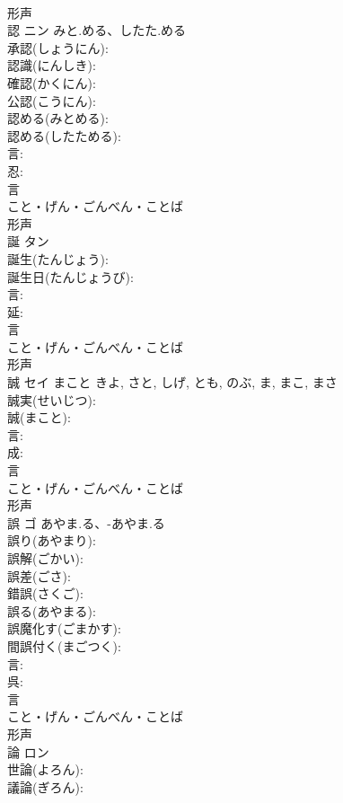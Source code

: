 \documentclass[8pt]{extreport}
\begin{document}
\begin{CJK}{UTF8}{min}
\\	形声 
\\	認	ニン	みと.める、したた.める		
\\	承認(しょうにん): 
\\	認識(にんしき): 
\\	確認(かくにん): 
\\	公認(こうにん): 
\\	認める(みとめる): 
\\	認める(したためる): 
\\	言: 
\\	忍: 
\\	言	
\\	こと・げん・ごんべん・ことば	
\\	形声 
\\	誕	タン			
\\	誕生(たんじょう): 
\\	誕生日(たんじょうび): 
\\	言: 
\\	延: 
\\	言	
\\	こと・げん・ごんべん・ことば	
\\	形声 
\\	誠	セイ	まこと	きよ, さと, しげ, とも, のぶ, ま, まこ, まさ	
\\	誠実(せいじつ): 
\\	誠(まこと): 
\\	言: 
\\	成: 
\\	言	
\\	こと・げん・ごんべん・ことば	
\\	形声 
\\	誤	ゴ	あやま.る、-あやま.る		
\\	誤り(あやまり): 
\\	誤解(ごかい): 
\\	誤差(ごさ): 
\\	錯誤(さくご): 
\\	誤る(あやまる): 
\\	誤魔化す(ごまかす): 
\\	間誤付く(まごつく): 
\\	言: 
\\	呉: 
\\	言	
\\	こと・げん・ごんべん・ことば	
\\	形声 
\\	論	ロン			
\\	世論(よろん): 
\\	議論(ぎろん): 

\end{CJK}
\end{document}
